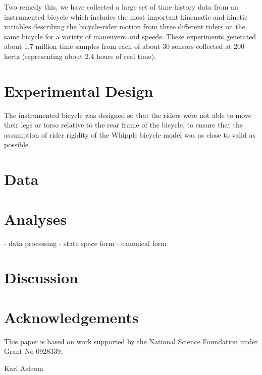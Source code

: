 \documentclass{article}
\begin{document}
Two remedy this, we have collected a large set of time history data from an
instrumented bicycle which includes the most important kinematic and kinetic
variables describing the bicycle-rider motion from three different riders on
the same bicycle for a variety of maneuvers and speeds. These experiments
generated about 1.7 million time samples from each of about 30 sensors
collected at 200 hertz (representing about 2.4 hours of real time).

\section{Experimental Design}

The instrumented bicycle was designed so that the riders were not able to move
their legs or torso relative to the rear frame of the bicycle, to ensure that
the assumption of rider rigidity of the Whipple bicycle model was as close to
valid as possible.

\section{Data}

\section{Analyses}

- data processing
- state space form
- canonical form

\section{Discussion}


\section{Acknowledgements}

This paper is based on work supported by the National Science Foundation under
Grant No 0928339.

Karl Astrom
\end{document}
